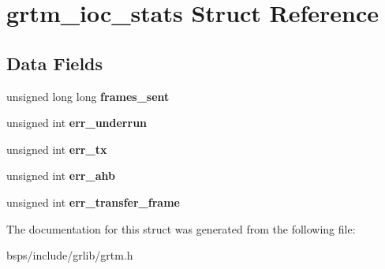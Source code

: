 \hypertarget{structgrtm__ioc__stats}{}\section{grtm\+\_\+ioc\+\_\+stats Struct Reference}
\label{structgrtm__ioc__stats}
\subsection*{Data Fields}
\begin{DoxyCompactItemize}
\item 
\mbox{\label{structgrtm__ioc__stats_aafd65841d494626f59502ee5396b6d10}} 
unsigned long long {\bfseries frames\+\_\+sent}
\item 
\mbox{\label{structgrtm__ioc__stats_a9ec08c14fa3f1d5054786d01c7098fcc}} 
unsigned int {\bfseries err\+\_\+underrun}
\item 
\mbox{\label{structgrtm__ioc__stats_a3dfe9a9fd4e363dad92dc9fab09b6042}} 
unsigned int {\bfseries err\+\_\+tx}
\item 
\mbox{\label{structgrtm__ioc__stats_abbc07361c90cd15b57f4009d471ab02c}} 
unsigned int {\bfseries err\+\_\+ahb}
\item 
\mbox{\label{structgrtm__ioc__stats_ab124473c80c462cbe17d503f56b8dbfa}} 
unsigned int {\bfseries err\+\_\+transfer\+\_\+frame}
\end{DoxyCompactItemize}


The documentation for this struct was generated from the following file\+:\begin{DoxyCompactItemize}
\item 
bsps/include/grlib/grtm.\+h\end{DoxyCompactItemize}
